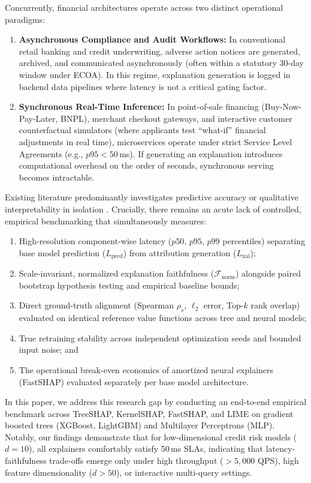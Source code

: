 \documentclass[conference]{IEEEtran}
\begin{document}
Concurrently, financial architectures operate across two distinct operational paradigms:
\begin{enumerate}
    \item \textbf{Asynchronous Compliance and Audit Workflows:} In conventional retail banking and credit underwriting, adverse action notices are generated, archived, and communicated asynchronously (often within a statutory 30-day window under ECOA). In this regime, explanation generation is logged in backend data pipelines where latency is not a critical gating factor.
    \item \textbf{Synchronous Real-Time Inference:} In point-of-sale financing (Buy-Now-Pay-Later, BNPL), merchant checkout gateways, and interactive customer counterfactual simulators (where applicants test ``what-if'' financial adjustments in real time), microservices operate under strict Service Level Agreements (e.g., $p95 < 50$\,ms). If generating an explanation introduces computational overhead on the order of seconds, synchronous serving becomes intractable.
\end{enumerate}

Existing literature predominantly investigates predictive accuracy or qualitative interpretability in isolation \cite{ribeiro2016why, lundberg2017unified, molnar2022interpretable}. Crucially, there remains an acute lack of controlled, empirical benchmarking that simultaneously measures:
\begin{enumerate}
    \item High-resolution component-wise latency ($p50$, $p95$, $p99$ percentiles) separating base model prediction ($L_{\text{pred}}$) from attribution generation ($L_{\text{xai}}$);
    \item Scale-invariant, normalized explanation faithfulness ($\mathcal{F}_{\text{norm}}$) alongside paired bootstrap hypothesis testing and empirical baseline bounds;
    \item Direct ground-truth alignment (Spearman $\rho_s$, $\ell_2$ error, Top-$k$ rank overlap) evaluated on identical reference value functions across tree and neural models;
    \item True retraining stability across independent optimization seeds and bounded input noise; and
    \item The operational break-even economics of amortized neural explainers (FastSHAP) evaluated separately per base model architecture.
\end{enumerate}

In this paper, we address this research gap by conducting an end-to-end empirical benchmark across TreeSHAP, KernelSHAP, FastSHAP, and LIME on gradient boosted trees (XGBoost, LightGBM) and Multilayer Perceptrons (MLP). Notably, our findings demonstrate that for low-dimensional credit risk models ($d=10$), all explainers comfortably satisfy 50\,ms SLAs, indicating that latency-faithfulness trade-offs emerge only under high throughput ($>5,000$ QPS), high feature dimensionality ($d > 50$), or interactive multi-query settings.
\end{document}
